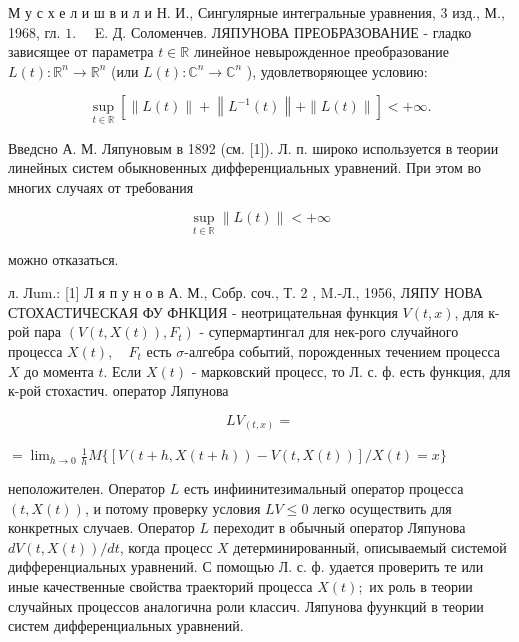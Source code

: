 \documentclass[10pt]{article}
\begin{document}
М у с х е л и ш в и л и Н. И., Сингулярные интегральные уравнения, 3 изд., М., 1968, гл. $1 . \quad$ E. Д. Соломенчев. ЛЯПУНОВА ПРЕОБРАЗОВАНИЕ - гладко зависящее от параметра $t \in \mathbb{R}$ линейное невырожденное преобразование $L(t): \mathbb{R}^{n} \rightarrow \mathbb{R}^{n}$ (или $L(t): \mathbb{C}^{n} \rightarrow \mathbb{C}^{n}$ ), удовлетворяющее условию:



\[

\sup _{t \in \mathbb{R}}\left[\|L(t)\|+\left\|L^{-1}(t)\right\|+\|L(t)\|\right]<+\infty .

\]



Введсно А. М. Ляпуновым в 1892 (см. [1]). Л. п. широко используется в теории линейных систем обыкновенных дифференциальных уравнений. При этом во многих случаях от требования



\[

\sup _{t \in \mathbb{R}}\|L(t)\|<+\infty

\]



можно отказаться.



л. Лum.: [1] Л я п у н о в А. М., Собр. соч., Т. 2 , M.-Л., 1956, ЛЯПУ НОВА СТОХАСТИЧЕСКАЯ ФУ ФНКЦИЯ - неотрицательная функция $V(t, x)$, для к-рой пара $\left(V(t, X(t)), F_{t}\right)$ - супермартингал для нек-рого случайного процесса $X(t), \quad F_{t}$ есть $\sigma$-алгебра событий, порожденных течением процесса $X$ до момента $t$. Если $X(t)$ - марковский процесс, то Л. с. ф. есть функция, для к-рой стохастич. оператор Ляпунова



\[

L V_{(t, x)}=

\]



$=\lim _{h \rightarrow 0} \frac{1}{h} M\{[V(t+h, X(t+h))-V(t, X(t))] / X(t)=x\}$



неположителен. Оператор $L$ есть инфиинитезимальный оператор процесса $(t, X(t))$, и потому проверку условия $L V \leqslant 0$ легко осуществить для конкретных случаев. Оператор $L$ переходит в обычный оператор Ляпунова $d V(t, X(t)) / d t$, когда процесс $X$ детерминированный, описываемый системой дифференциальных уравнений. С помощью Л. с. ф. удается проверить те или иные качественные свойства траекторий процесса $X(t) ;$ их роль в теории случайных процессов аналогична роли классич. Ляпунова фуункций в теории систем дифференциальных уравнений.
\end{document}
